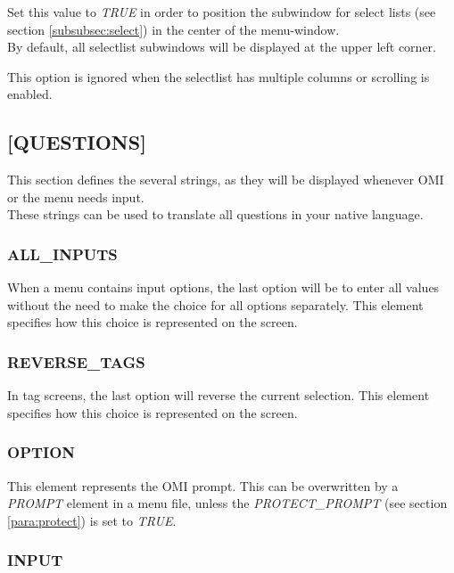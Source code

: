 \documentclass[a4paper]{book}
\begin{document}
Set this value to \textsl{TRUE} in order to position the subwindow for select lists (see section \ref{subsubsec:select}) in the center of the menu-window.\\
By default, all selectlist subwindows will be displayed at the upper left corner.

This option is ignored when the selectlist has multiple columns or scrolling is enabled.

\subsection{[QUESTIONS]}
\label{subsubsec:mylabel18}

This section defines the several strings, as they will be displayed whenever 
OMI or the menu needs input. \\
These strings can be used to translate all questions in your native 
language.

\subsubsection{ALL{\_}INPUTS}
\label{para:mylabel3}

When a menu contains input options, the last option will be to enter all 
values without the need to make the choice for all options separately. This 
element specifies how this choice is represented on the screen.

\subsubsection{REVERSE{\_}TAGS}

In tag screens, the last option will reverse the current selection. This 
element specifies how this choice is represented on the screen.

\subsubsection{OPTION}
\label{para:option}

This element represents the OMI prompt. This can be overwritten by a 
\textsl{PROMPT} element in a menu file, unless the \textsl{PROTECT{\_}PROMPT} (see section 
\ref{para:protect}) is set to \textsl{TRUE}.

\subsubsection{INPUT}
\label{para:input}
\end{document}
